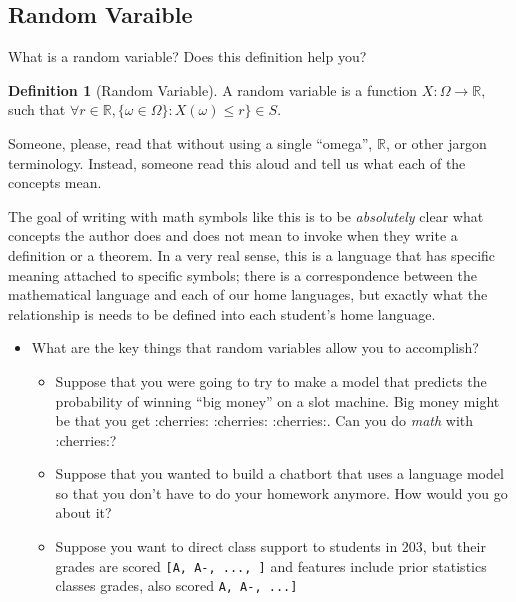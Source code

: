 \documentclass[
]{book}
\providecommand{\tightlist}{%
  \setlength{\itemsep}{0pt}\setlength{\parskip}{0pt}}
\theoremstyle{definition}
\newtheorem{definition}{Definition}[chapter]
\theoremstyle{definition}
\theoremstyle{definition}
\theoremstyle{definition}
\theoremstyle{remark}
\begin{document}
\hypertarget{random-varaible}{%
\subsection{Random Varaible}\label{random-varaible}}

What is a random variable? Does this definition help you?

\begin{definition}[Random Variable]
A random variable is a function \(X : \Omega \rightarrow \mathbb{R},\) such that \(\forall r \in \mathbb{R}, \{\omega \in \Omega\}: X(\omega) \leq r\} \in S\).
\end{definition}

Someone, please, read that without using a single ``omega'', \(\mathbb{R}\), or other jargon terminology. Instead, someone read this aloud and tell us what each of the concepts mean.

The goal of writing with math symbols like this is to be \emph{absolutely} clear what concepts the author does and does not mean to invoke when they write a definition or a theorem. In a very real sense, this is a language that has specific meaning attached to specific symbols; there is a correspondence between the mathematical language and each of our home languages, but exactly what the relationship is needs to be defined into each student's home language.

\begin{itemize}
\tightlist
\item
  What are the key things that random variables allow you to accomplish?

  \begin{itemize}
  \tightlist
  \item
    Suppose that you were going to try to make a model that predicts the probability of winning ``big money'' on a slot machine. Big money might be that you get :cherries: :cherries: :cherries:. Can you do \emph{math} with :cherries:?
  \item
    Suppose that you wanted to build a chatbort that uses a language model so that you don't have to do your homework anymore. How would you go about it?
  \item
    Suppose you want to direct class support to students in 203, but their grades are scored \texttt{{[}A,\ A-,\ ...,\ {]}} and features include prior statistics classes grades, also scored \texttt{A,\ A-,\ ...{]}}
  \end{itemize}
\end{itemize}
\end{document}
